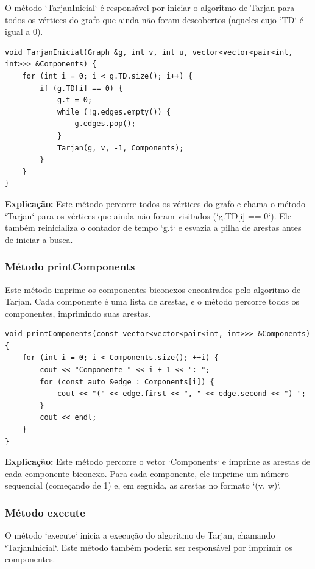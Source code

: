 \documentclass[10pt,conference]{IEEEtran}
\begin{document}
O método `TarjanInicial` é responsável por iniciar o algoritmo de Tarjan para todos os vértices do grafo que ainda não foram descobertos (aqueles cujo `TD` é igual a 0).

\begin{lstlisting}
void TarjanInicial(Graph &g, int v, int u, vector<vector<pair<int, int>>> &Components) {
    for (int i = 0; i < g.TD.size(); i++) {
        if (g.TD[i] == 0) {
            g.t = 0;
            while (!g.edges.empty()) {
                g.edges.pop();
            }
            Tarjan(g, v, -1, Components);
        }
    }
}
\end{lstlisting}

\textbf{Explicação:} Este método percorre todos os vértices do grafo e chama o método `Tarjan` para os vértices que ainda não foram visitados (`g.TD[i] == 0`). Ele também reinicializa o contador de tempo `g.t` e esvazia a pilha de arestas antes de iniciar a busca.

\subsubsection{Método printComponents}

Este método imprime os componentes biconexos encontrados pelo algoritmo de Tarjan. Cada componente é uma lista de arestas, e o método percorre todos os componentes, imprimindo suas arestas.

\begin{lstlisting}
void printComponents(const vector<vector<pair<int, int>>> &Components) {
    for (int i = 0; i < Components.size(); ++i) {
        cout << "Componente " << i + 1 << ": ";
        for (const auto &edge : Components[i]) {
            cout << "(" << edge.first << ", " << edge.second << ") ";
        }
        cout << endl;
    }
}
\end{lstlisting}

\textbf{Explicação:} Este método percorre o vetor `Components` e imprime as arestas de cada componente biconexo. Para cada componente, ele imprime um número sequencial (começando de 1) e, em seguida, as arestas no formato `(v, w)`.

\subsubsection{Método execute}

O método `execute` inicia a execução do algoritmo de Tarjan, chamando `TarjanInicial`. Este método também poderia ser responsável por imprimir os componentes.
\end{document}
